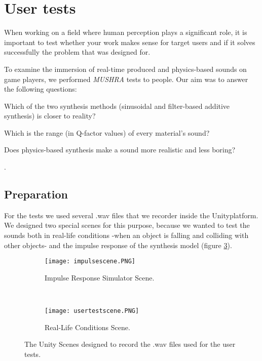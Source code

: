 \section{User tests}\label{sec:tests}

When working on a field where human perception plays a significant role, it is important to test whether your work makes sense for target users and if it solves successfully the problem that was designed for.

To examine the immersion of real-time produced and physics-based sounds on game players, we performed \textit{MUSHRA}\cite{series2014method} tests to people. Our aim was to answer the following questions: \begin{inparaenum}[1)]
\item Which of the two synthesis methods (sinusoidal and filter-based additive synthesis) is closer to reality? 
\item Which is the range (in Q-factor values) of every material's sound?
\item Does physics-based synthesis make a sound more realistic and less boring?
\end{inparaenum}.

\subsection{Preparation}
For the tests we used several .wav files that we recorder inside the Unity\textregistered platform. We designed two special scenes for this purpose, because we wanted to test the sounds both in real-life conditions -when an object is falling and colliding with other objects- and the impulse response of the synthesis model (figure \ref{fig:test_scenes}). 

\begin{figure}[H]
    \centering
    \begin{subfigure}[b]{0.45\textwidth}
        \texttt{[image: impulsescene.PNG]}
        \caption{Impulse Response Simulator Scene.}
        \label{fig:test_sc1}
    \end{subfigure}
    ~ %
    \begin{subfigure}[b]{0.45\textwidth}
        \texttt{[image: usertestscene.PNG]}
        \caption{Real-Life Conditions Scene.}
        \label{fig:test_sc2}
    \end{subfigure}
    \caption{The Unity Scenes designed to record the .wav files used for the user tests.}\label{fig:test_scenes}
\end{figure}

